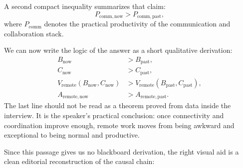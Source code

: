 A second compact inequality summarizes that claim:
\begin{equation}
P_{\mathrm{comm},\mathrm{now}} > P_{\mathrm{comm},\mathrm{past}} ,
\end{equation}
where \(P_{\mathrm{comm}}\) denotes the practical productivity of the communication and collaboration stack.

We can now write the logic of the answer as a short qualitative derivation:
\begin{align}
B_{\mathrm{now}} &> B_{\mathrm{past}},\\
C_{\mathrm{now}} &> C_{\mathrm{past}},\\
V_{\mathrm{remote}}(B_{\mathrm{now}},C_{\mathrm{now}})
&>
V_{\mathrm{remote}}(B_{\mathrm{past}},C_{\mathrm{past}}),\\
A_{\mathrm{remote},\mathrm{now}}
&>
A_{\mathrm{remote},\mathrm{past}} .
\end{align}
The last line should not be read as a theorem proved from data inside the interview. It is the speaker's practical conclusion: once connectivity and coordination improve enough, remote work moves from being awkward and exceptional to being normal and productive.

Since this passage gives us no blackboard derivation, the right visual aid is a clean editorial reconstruction of the causal chain:

\begin{figure}
\centering
{}
\end{figure}


